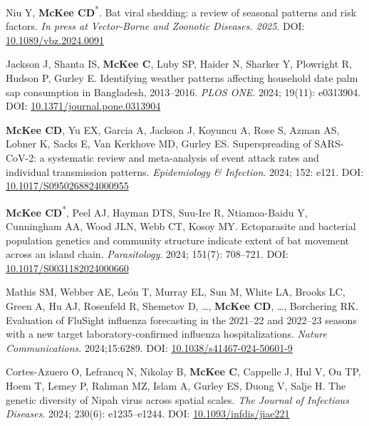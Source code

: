 \documentclass{cv}
\begin{document}
\begin{pubenum}

\item Niu Y\textsuperscript{\ddag}, \textbf{McKee CD}\textsuperscript{*}. Bat viral shedding: a review of seasonal patterns and risk factors. \textit{In press at Vector-Borne and Zoonotic Diseases. 2025}. DOI: \href{https://doi.org/10.1089/vbz.2024.0091}{10.1089/vbz.2024.0091}

\item Jackson J\textsuperscript{\ddag}, Shanta IS, \textbf{McKee C}, Luby SP, Haider N, Sharker Y, Plowright R, Hudson P, Gurley E. Identifying weather patterns affecting household date palm sap consumption in Bangladesh, 2013--2016. \textit{PLOS ONE}. 2024; 19(11): e0313904. DOI: \href{https://doi.org/10.1371/journal.pone.0313904}{10.1371/journal.pone.0313904}

\item \textbf{McKee CD}, Yu EX, Garcia A\textsuperscript{\ddag}, Jackson J\textsuperscript{\ddag}, Koyuncu A, Rose S, Azman AS, Lobner K, Sacks E, Van Kerkhove MD, Gurley ES. Superspreading of SARS-CoV-2: a systematic review and meta-analysis of event attack rates and individual transmission patterns. \textit{Epidemiology \& Infection}. 2024; 152: e121. DOI: \href{https://doi.org/10.1017/S0950268824000955}{10.1017/S0950268824000955}

\item \textbf{McKee CD}\textsuperscript{*}, Peel AJ, Hayman DTS, Suu-Ire R, Ntiamoa-Baidu Y, Cunningham AA, Wood JLN, Webb CT, Kosoy MY. Ectoparasite and bacterial population genetics and community structure indicate extent of bat movement across an island chain. \textit{Parasitology}. 2024; 151(7): 708--721. DOI: \href{https://doi.org/10.1017/S0031182024000660}{10.1017/S0031182024000660}

\item Mathis SM, Webber AE, León T, Murray EL, Sun M, White LA, Brooks LC, Green A, Hu AJ, Rosenfeld R, Shemetov D, …, \textbf{McKee CD}, …, Borchering RK. Evaluation of FluSight influenza forecasting in the 2021--22 and 2022--23 seasons with a new target laboratory-confirmed influenza hospitalizations. \textit{Nature Communications}. 2024;15:6289. DOI: \href{https://doi.org/10.1038/s41467-024-50601-9}{10.1038/s41467-024-50601-9}

\item Cortes-Azuero O, Lefrancq N, Nikolay B, \textbf{McKee C}, Cappelle J, Hul V, Ou TP, Hoem T, Lemey P, Rahman MZ, Islam A, Gurley ES, Duong V, Salje H. The genetic diversity of Nipah virus across spatial scales. \textit{The Journal of Infectious Diseases}. 2024; 230(6): e1235--e1244. DOI: \href{https://doi.org/10.1093/infdis/jiae221}{10.1093/infdis/jiae221}


\end{pubenum}
\end{document}
